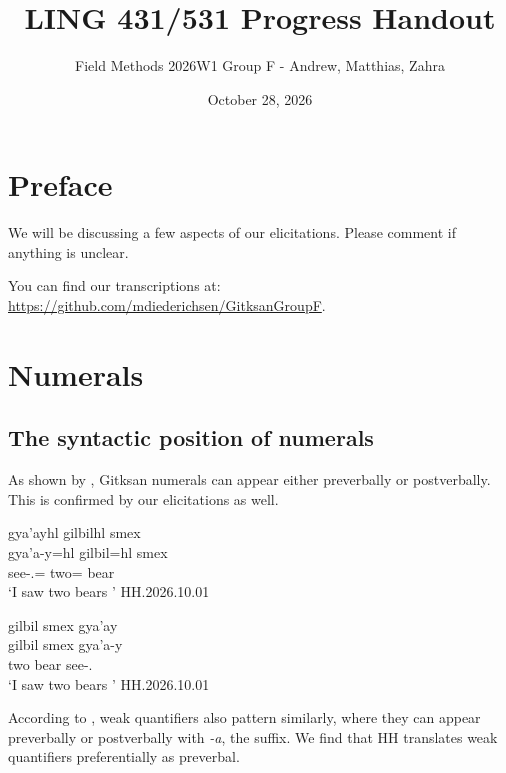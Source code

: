 \documentclass{article}
\begin{document}
\title{LING 431/531 Progress Handout}
\author{Field Methods 2026W1 Group F - Andrew, Matthias, Zahra}
\date{October 28, 2026}
\maketitle

\tableofcontents

\section{Preface}

We will be discussing a few aspects of our elicitations. Please comment if anything is unclear.

You can find our transcriptions at: \url{https://github.com/mdiederichsen/GitksanGroupF}.

\section{Numerals}
\subsection{The syntactic position of numerals}
As shown by \textcite{bicevskisQuantificationGitksan2017}, Gitksan numerals can appear either preverbally or postverbally. This is confirmed by our elicitations as well.

\begin{exe}
    \ex 
    \begin{xlist}
    \item     \label{ex:postgilbil} \glll gya'ayhl gilbilhl smex \\
    gya'a-y=hl gilbil=hl smex \\
    see-\Fsg{}.\Ii{}=\Cn{} two=\Cn{} bear \\
    `I saw two bears ' \hfill HH.2026.10.01
    \item \label{ex:pregilbil} \glll gilbil smex gya'ay \\
    gilbil smex gya'a-y \\
    two bear see-\Fsg{}.\Ii{} \\
    `I saw two bears ' \hfill HH.2026.10.01
    \end{xlist}
\end{exe}

According to \textcite{bicevskisQuantificationGitksan2017}, weak quantifiers also pattern similarly, where they can appear preverbally or postverbally with \textit{-a}, the \Attr{} suffix. We find that HH translates weak quantifiers preferentially as preverbal.
\end{document}

